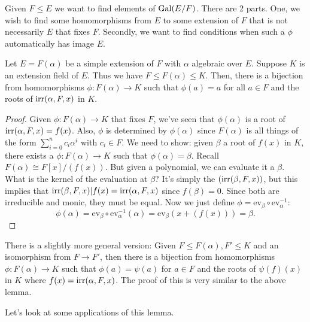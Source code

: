 \documentclass{../mathnotes}
\begin{document}
Given $F\leq E$ we want to find elements of $\operatorname{Gal}(E/F)$. There are 2 parts. One, we wish to find some homomorphisms from $E$ to
some extension of $F$ that is not necessarily $E$ that fixes $F$. Secondly, we want to find conditions when such a $\phi$ automatically
has image $E$.

\begin{lem}
    Let $E=F(\alpha)$ be a simple extension of $F$ with $\alpha$ algebraic over $E$. Suppose $K$ is an extension field of $E$.
    Thus we have $F\leq F(\alpha)\leq K$. Then, there is a bijection from homomorphisms $\phi:F(\alpha)\to K$ such that $\phi(a)=a$
    for all $a\in F$ and the roots of $\operatorname{irr}(\alpha,F,x)$ in $K$.
\end{lem}

\begin{proof}
    Given $\phi:F(\alpha)\to K$ that fixes $F$, we've seen that $\phi(\alpha)$ is a root of $\operatorname{irr}(\alpha,F,x)=f(x)$.
    Also, $\phi$ is determined by $\phi(\alpha)$ since $F(\alpha)$ is all things of the form $\sum_{i=0}^nc_i\alpha^i$ with $c_i\in F$.
    We need to show: given $\beta$ a root of $f(x)$ in $K$, there exists a $\phi:F(\alpha)\to K$ such that $\phi(\alpha)=\beta$.
    Recall $F(\alpha)\cong F[x]/(f(x))$. But given a polynomial, we can evaluate it a $\beta$. What is the kernel of the evaluation at $\beta$?
    It's simply the $(\operatorname{irr}(\beta,F,x))$, but this implies that $\operatorname{irr}(\beta,F,x)|f(x)=\operatorname{irr}(\alpha,F,x)$ since $f(\beta)=0$. Since both are irreducible
    and monic, they must be equal. Now we just define $\phi=\text{ev}_\beta\circ\text{ev}_\alpha^{-1}$:
    \[\phi(\alpha)=\text{ev}_\beta\circ\text{ev}_\alpha^{-1}(\alpha)=\text{ev}_\beta(x+(f(x)))=\beta.\]
\end{proof}

\begin{rem}
    There is a slightly more general version: Given $F\leq F(\alpha),F'\leq K$ and an isomorphism from $F\to F'$,
    then there is a bijection from homomorphisms $\phi:F(\alpha)\to K$ such that $\phi(a)=\psi(a)$ for $a\in F$ and the
    roots of $\psi(f)(x)$ in $K$ where $f(x)=\operatorname{irr}(\alpha,F,x)$. The proof of this is very similar to the above lemma.
\end{rem}

Let's look at some applications of this lemma.
\end{document}
